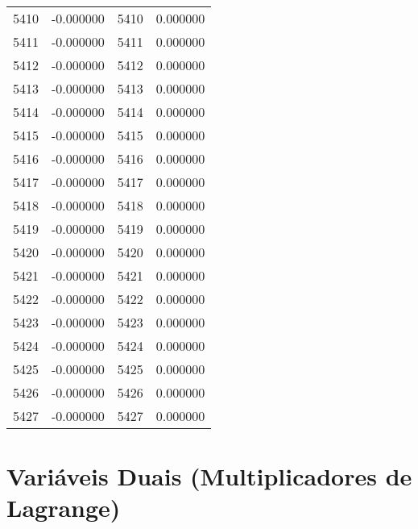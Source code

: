 \documentclass[12pt]{article}
\begin{document}
\begin{longtable}{@{}cccc@{}}
5410 & -0.000000 & 5410 & 0.000000 \\
5411 & -0.000000 & 5411 & 0.000000 \\
5412 & -0.000000 & 5412 & 0.000000 \\
5413 & -0.000000 & 5413 & 0.000000 \\
5414 & -0.000000 & 5414 & 0.000000 \\
5415 & -0.000000 & 5415 & 0.000000 \\
5416 & -0.000000 & 5416 & 0.000000 \\
5417 & -0.000000 & 5417 & 0.000000 \\
5418 & -0.000000 & 5418 & 0.000000 \\
5419 & -0.000000 & 5419 & 0.000000 \\
5420 & -0.000000 & 5420 & 0.000000 \\
5421 & -0.000000 & 5421 & 0.000000 \\
5422 & -0.000000 & 5422 & 0.000000 \\
5423 & -0.000000 & 5423 & 0.000000 \\
5424 & -0.000000 & 5424 & 0.000000 \\
5425 & -0.000000 & 5425 & 0.000000 \\
5426 & -0.000000 & 5426 & 0.000000 \\
5427 & -0.000000 & 5427 & 0.000000 \\

\end{longtable}

\section{Variáveis Duais (Multiplicadores de Lagrange)}
\end{document}

